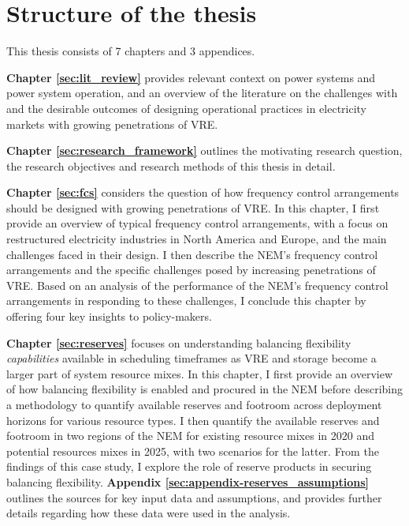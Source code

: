 \documentclass[12pt,a4paper,]{report}
\begin{document}
\hypertarget{structure-of-the-thesis}{%
\section{Structure of the thesis}\label{structure-of-the-thesis}}

This thesis consists of 7 chapters and 3 appendices.

\textbf{Chapter \ref{sec:lit_review}} provides relevant context on power
systems and power system operation, and an overview of the literature on
the challenges with and the desirable outcomes of designing operational
practices in electricity markets with growing penetrations of VRE.

\textbf{Chapter \ref{sec:research_framework}} outlines the motivating
research question, the research objectives and research methods of this
thesis in detail.

\textbf{Chapter \ref{sec:fcs}} considers the question of how frequency
control arrangements should be designed with growing penetrations of
VRE. In this chapter, I first provide an overview of typical frequency
control arrangements, with a focus on restructured electricity
industries in North America and Europe, and the main challenges faced in
their design. I then describe the NEM's frequency control arrangements
and the specific challenges posed by increasing penetrations of VRE.
Based on an analysis of the performance of the NEM's frequency control
arrangements in responding to these challenges, I conclude this chapter
by offering four key insights to policy-makers.

\textbf{Chapter \ref{sec:reserves}} focuses on understanding balancing
flexibility \emph{capabilities} available in scheduling timeframes as
VRE and storage become a larger part of system resource mixes. In this
chapter, I first provide an overview of how balancing flexibility is
enabled and procured in the NEM before describing a methodology to
quantify available reserves and footroom across deployment horizons for
various resource types. I then quantify the available reserves and
footroom in two regions of the NEM for existing resource mixes in 2020
and potential resources mixes in 2025, with two scenarios for the
latter. From the findings of this case study, I explore the role of
reserve products in securing balancing flexibility. \textbf{Appendix
\ref{sec:appendix-reserves_assumptions}} outlines the sources for key
input data and assumptions, and provides further details regarding how
these data were used in the analysis.
\end{document}
